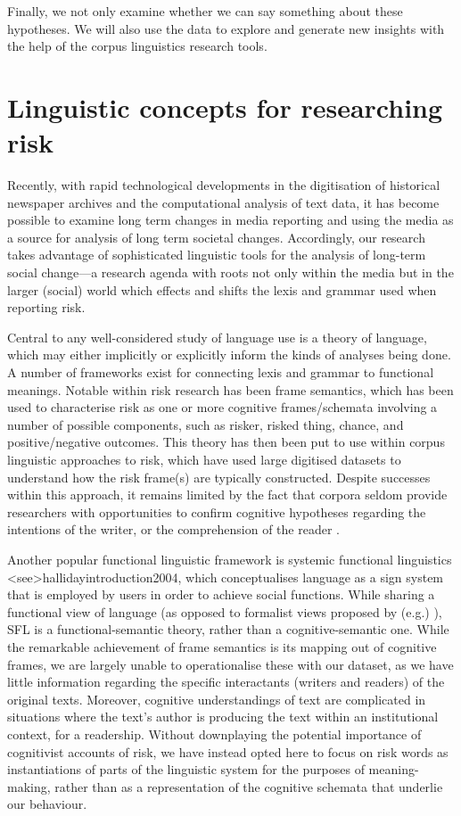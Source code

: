 Finally, we not only examine whether we can say something about these hypotheses. We will also use the data to explore and generate new insights with the help of the corpus linguistics research tools.

\section{Linguistic concepts for researching risk}

Recently, with rapid technological developments in the digitisation of historical newspaper archives and the computational analysis of text data, it has become possible to examine long term changes in media reporting and using the media as a source for analysis of long term societal changes. Accordingly, our research takes advantage of sophisticated linguistic tools for the analysis of long-term social change---a research agenda with roots not only within the media but in the larger (social) world which effects and shifts the lexis and grammar used when reporting risk.

Central to any well-considered study of language use is a theory of language, which may either implicitly or explicitly inform the kinds of analyses being done. A number of frameworks exist for connecting lexis and grammar to functional meanings. Notable within risk research has been frame semantics, which has been used to characterise risk as one or more cognitive frames/schemata involving a number of possible components, such as risker, risked thing, chance, and positive/negative outcomes. This theory has then been put to use within corpus linguistic approaches to risk, which have used large digitised datasets to understand how the risk frame(s) are typically constructed. Despite successes within this approach, it remains limited by the fact that corpora seldom provide researchers with opportunities to confirm cognitive hypotheses regarding the intentions of the writer, or the comprehension of the reader .

Another popular functional linguistic framework is systemic functional linguistics <see>hallidayintroduction2004, which conceptualises language as a sign system that is employed by users in order to achieve social functions. While sharing a functional view of language (as opposed to formalist views proposed by (e.g.) ), SFL is a functional-semantic theory, rather than a cognitive-semantic one. While the remarkable achievement of frame semantics is its mapping out of cognitive frames, we are largely unable to operationalise these with our dataset, as we have little information regarding the specific interactants (writers and readers) of the original texts. Moreover, cognitive understandings of text are complicated in situations where the text's author is producing the text within an institutional context, for a readership. Without downplaying the potential importance of cognitivist accounts of risk, we have instead opted here to focus on risk words as instantiations of parts of the linguistic system for the purposes of meaning-making, rather than as a representation of the cognitive schemata that underlie our behaviour.

